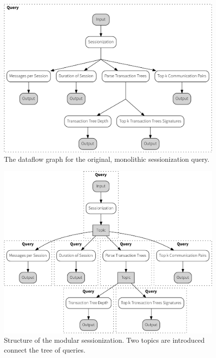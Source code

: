\begin{figure}[p]
  \centering
    \includegraphics[width=1\textwidth]{figures/sessionize_dataflow-crop}
  \caption[Dataflow graph for monolithic sessionization]{The dataflow graph
  for the original, monolithic sessionization query.}
  \label{fig:monolith}
\end{figure}

\begin{figure}[p]
  \centering
    \includegraphics[width=1\textwidth]{figures/sessionize_split-crop}
  \caption[Dataflow graph for modular sessionization]{Structure of the modular
  sessionization. Two topics are introduced connect the tree of queries.}
  \label{fig:split}
\end{figure}

